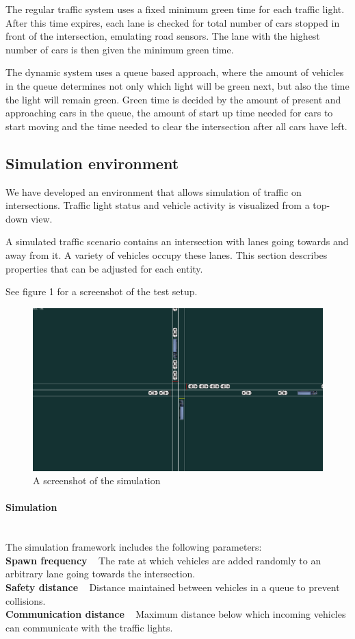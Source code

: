 \documentclass{article}
\begin{document}
The regular traffic system uses a fixed minimum green time for each traffic light. After this time expires, each lane is checked for total number of cars stopped in front of the intersection, emulating road sensors. The lane with the highest number of cars is then given the minimum green time.

The dynamic system uses a queue based approach, where the amount of vehicles in the queue determines not only which light will be green next, but also the time the light will remain green. Green time is decided by the amount of present and approaching cars in the queue, the amount of start up time needed for cars to start moving and the time needed to clear the intersection after all cars have left. 


\subsection{Simulation environment}
We have developed an environment that allows simulation of traffic on intersections. Traffic light status and vehicle activity is visualized from a top-down view.

A simulated traffic scenario contains an intersection with lanes going towards and away from it. A variety of vehicles occupy these lanes. This section describes properties that can be adjusted for each entity.

See figure 1 for a screenshot of the test setup.

\begin{figure}[h!]
\includegraphics[width=12cm]{sim_screenshot.png}
\caption{A screenshot of the simulation}
\end{figure}

\paragraph{Simulation} ~\\
The simulation framework includes the following parameters: \\
\textbf{Spawn frequency} ~ The rate at which vehicles are added randomly to an arbitrary lane going towards the intersection.\\
\textbf{Safety distance} ~ Distance maintained between vehicles in a queue to prevent collisions.\\
\textbf{Communication distance} ~ Maximum distance below which incoming vehicles can communicate with the traffic lights.
\end{document}
